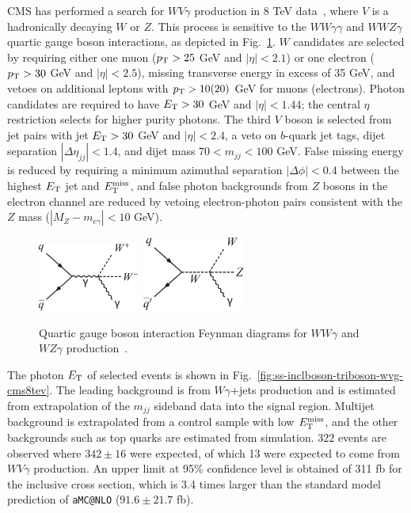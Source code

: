 CMS has performed a search for $WV\gamma$ production in 8 TeV
data~\cite{Chatrchyan:2014bza}, where $V$ is a hadronically decaying
$W$ or $Z$.  This process is sensitive to the $WW\gamma\gamma$ and
$WWZ\gamma$ quartic gauge boson interactions, as depicted in
Fig.~\ref{fig:ss-inclboson-triboson-wvg-diagrams}.  $W$ candidates are
selected by requiring either one muon ($p_{\mathrm{T}} > 25$ GeV and
$|\eta|<2.1$) or one electron ($p_{\mathrm{T}} > 30$ GeV and $|\eta| < 2.5$),
missing transverse energy in excess of 35 GeV, and vetoes on
additional leptons with $p_{\mathrm{T}} > 10 (20)$ GeV for muons (electrons).
Photon candidates are required to have $E_{\mathrm{T}} > 30$ GeV and $|\eta| <
1.44$; the central $\eta$ restriction selects for higher purity
photons.  The third $V$ boson is selected from jet pairs with jet $E_{\mathrm{T}}
> 30$ GeV and $|\eta| < 2.4$, a veto on $b$-quark jet tags, dijet
separation $|\Delta\eta_{jj}| < 1.4$, and dijet mass $70 < m_{jj} <
100$ GeV.  False missing energy is reduced by requiring a minimum
azimuthal separation $|\Delta\phi| < 0.4$ between the highest $E_{\mathrm{T}}$
jet and $E_{\mathrm{T}}^{\mathrm{miss}}$, and false photon backgrounds from $Z$ bosons in the
electron channel are reduced by vetoing electron-photon pairs
consistent with the $Z$ mass ($|M_Z-m_{e\gamma}| < 10$ GeV).

\begin{figure}[p]
    \centering
    \includegraphics[width=0.3\textwidth]{figures/ss-inclboson-triboson-wvg-diagram1.pdf}
    \includegraphics[width=0.3\textwidth]{figures/ss-inclboson-triboson-wvg-diagram2.pdf}
    \caption{Quartic gauge boson interaction Feynman diagrams for $WW\gamma$ and $WZ\gamma$ production~\cite{Chatrchyan:2014bza}.}
    \label{fig:ss-inclboson-triboson-wvg-diagrams}
\end{figure}


The photon $E_{\mathrm{T}}$ of selected events is shown in
Fig.~\ref{fig:ss-inclboson-triboson-wvg-cms8tev}.  The leading
background is from $W\gamma$+jets production and is estimated from
extrapolation of the $m_{jj}$ sideband data into the signal region.
Multijet background is extrapolated from a control sample with low
$E_{\mathrm{T}}^{\mathrm{miss}}$, and the other backgrounds such as top quarks are estimated
from simulation.  322 events are observed where $342\pm 16$ were
expected, of which 13 were expected to come from $WV\gamma$
production.  An upper limit at 95\% confidence level is obtained of
311 fb for the inclusive cross section, which is 3.4 times larger than
the standard model prediction of \texttt{aMC@NLO} ($91.6 \pm 21.7$ fb).

